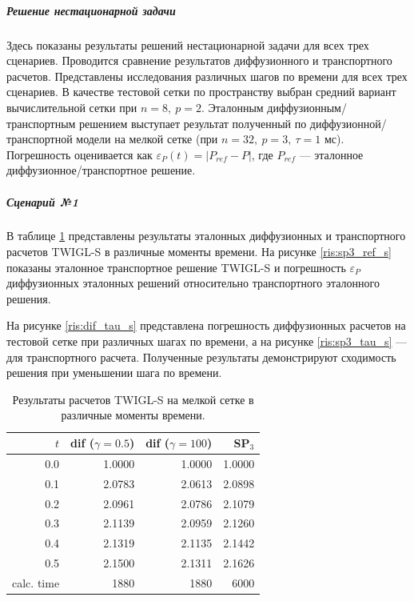 \documentclass{crm-article}
\begin{document}
\subparagraph{Решение нестационарной задачи}
Здесь показаны результаты решений нестационарной задачи для всех трех сценариев.
Проводится сравнение результатов диффузионного и транспортного расчетов.
Представлены исследования различных шагов по времени для всех трех сценариев.  
В качестве тестовой сетки по пространству выбран средний вариант вычислительной сетки при $n=8,\ p=2$.
Эталонным диффузионным/транспортным решением выступает результат полученный по диффузионной/транспортной модели на мелкой сетке (при $n=32,\ p=3,\ \tau=1$ мс).
Погрешность оценивается как $\varepsilon_P(t) = | P_{ref} - P |$, где $P_{ref}$ --- эталонное диффузионное/транспортное решение.

\subparagraph{Сценарий №1}
В таблице \ref{table:twigl-s} представлены результаты эталонных диффузионных и транспортного расчетов TWIGL-S в различные моменты времени.
На рисунке \ref{ris:sp3_ref_s} показаны эталонное транспортное решение TWIGL-S и погрешность $\varepsilon_P$ диффузионных эталонных решений относительно транспортного эталонного решения. 

На рисунке \ref{ris:dif_tau_s} представлена погрешность диффузионных расчетов на тестовой сетке при различных шагах по времени, а на рисунке \ref{ris:sp3_tau_s} --- для транспортного расчета. Полученные результаты демонстрируют сходимость решения при уменьшении шага по времени.

\begin{table}[ht]
\caption{Результаты расчетов TWIGL-S на мелкой сетке в различные моменты времени.}
\label{table:twigl-s}
\begin{center}
\begin{tabular}{r r r r}
\hline
$t$ & dif ($\gamma=0.5$) & dif ($\gamma=100$) & SP$_3$\\
\hline
0.0 & 1.0000 & 1.0000 & 1.0000 \\
0.1 & 2.0783 & 2.0613 & 2.0898 \\
0.2 & 2.0961 & 2.0786 & 2.1079 \\
0.3 & 2.1139 & 2.0959 & 2.1260 \\
0.4 & 2.1319 & 2.1135 & 2.1442 \\
0.5 & 2.1500 & 2.1311 & 2.1626 \\
\hline
calc. time & 1880 & 1880 & 6000 \\
\end{tabular}
\end{center}
\end{table}
\end{document}
